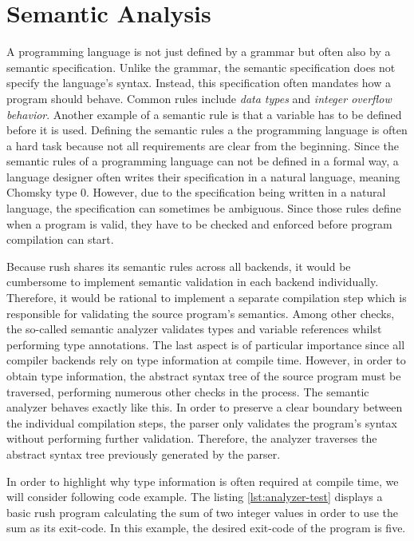 \section{Semantic Analysis}

A programming language is not just defined by a grammar but often also by a semantic specification.
Unlike the grammar, the semantic specification does not specify the language's syntax.
Instead, this  specification often mandates how a program should behave.
Common rules include \emph{data types} and \emph{integer overflow behavior}.
Another example of a semantic rule is that a variable has to be defined before it is used.
Defining the semantic rules a the programming language is often a hard task because not all requirements are clear from the beginning.
Since the semantic rules of a programming language can not be defined in a formal way,
a language designer often writes their specification in a natural language, meaning Chomsky type 0.
However, due to the specification being written in a natural language, the specification can sometimes be ambiguous.
Since those rules define when a program is valid, they have to be checked and enforced before program compilation can start.

Because rush shares its semantic rules across all backends,
it would be cumbersome to implement semantic validation in each
backend individually. Therefore, it would be rational to implement a separate
compilation step which is responsible for validating the source program's
semantics. Among other checks, the so-called semantic analyzer validates types
and variable references whilst performing type annotations. The last aspect is
of particular importance since all compiler backends rely on type information at
compile time. However, in order to obtain type information, the abstract syntax
tree of the source program must be traversed, performing numerous other checks
in the process. The semantic analyzer behaves exactly like this. In order to
preserve a clear boundary between the individual compilation steps, the parser
only validates the program's syntax without performing further validation.
Therefore, the analyzer traverses the abstract syntax tree previously generated
by the parser.

In order to highlight why type information is often required at compile time, we
will consider following code example. The listing \ref{lst:analyzer-test} displays a basic rush program
calculating the sum of two integer values in order to use the sum as its
exit-code. In this example, the desired exit-code of the program is five.

